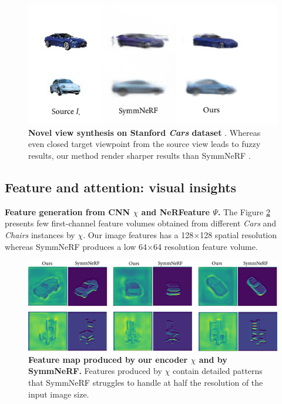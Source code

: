 \begin{figure}[h!]
    \begin{center}
  \includegraphics[width=\linewidth]{images/epinerf/supp_CarsStandford.png}
  \caption{\textbf{Novel view synthesis on Stanford \textit{Cars} dataset} \citep{krause20133d}. Whereas even closed target viewpoint from the source view leads to fuzzy results, our method render sharper results than SymmNeRF \citep{li2022symmnerf}. }
  \label{fig:res_Stanfordcar}
  \end{center}
\end{figure}

\subsection{Feature and attention: visual insights}
\label{subsec:visual_insights}

\noindent \textbf{Feature generation from CNN $\chi$ and NeRFeature $\Psi$.} The Figure \ref{fig:feature_illustration} presents few first-channel feature volumes obtained from different \textit{Cars} and \textit{Chairs} instances by $\chi$. Our image features has a 128$\times$128 spatial resolution whereas SymmNeRF produces a low  64$\times$64 resolution feature volume. 

\begin{figure}[h!]
\begin{center}
\includegraphics[width=\linewidth]{images/epinerf/feature_supp_NEW.png}
   \caption{\textbf{Feature map produced by our encoder $\chi$ and by SymmNeRF.} Features produced by $\chi$ contain detailed patterns that SymmNeRF struggles to handle at half the resolution of the input image size.}
\label{fig:feature_illustration}
\end{center}
\end{figure} 

